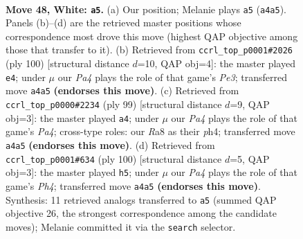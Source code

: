 \documentclass[11pt]{article}
\begin{document}
\clearpage

\begin{figure}[p]\centering
\begin{subfigure}{0.46\textwidth}\centering
\resizebox{\linewidth}{!}{%
\newchessgame
\chessboard[
  setfen={R7/6kr/8/8/P7/6K1/8/8 w - - 3 48},
  showmover=false,
  pgfstyle=straightmove, color=movearrow, markmove={a4-a5}
]}
\caption{}
\end{subfigure}\hfill
\begin{subfigure}{0.46\textwidth}\centering
\resizebox{\linewidth}{!}{%
\newchessgame
\chessboard[
  setfen={8/5R2/rkp5/8/8/4P3/1K6/8 w - - 6 51},
  showmover=false,
  pgfstyle=straightmove, color=movearrow, markmove={e3-e4}
]}
\caption{}
\end{subfigure}
\\[4pt]
\begin{subfigure}{0.46\textwidth}\centering
\resizebox{\linewidth}{!}{%
\newchessgame
\chessboard[
  setfen={8/8/7R/p2k3K/7P/r7/8/8 b - - 0 50},
  showmover=false,
  pgfstyle=straightmove, color=movearrow, markmove={a5-a4}
]}
\caption{}
\end{subfigure}\hfill
\begin{subfigure}{0.46\textwidth}\centering
\resizebox{\linewidth}{!}{%
\newchessgame
\chessboard[
  setfen={8/5k1K/5r2/8/7P/8/8/6R1 w - - 0 51},
  showmover=false,
  pgfstyle=straightmove, color=movearrow, markmove={h4-h5}
]}
\caption{}
\end{subfigure}
\caption{\textbf{Move 48, White: \texttt{a5}.} (a) Our position; Melanie plays \texttt{a5} (\texttt{a4a5}). Panels (b)--(d) are the retrieved master positions whose correspondence most drove this move (highest QAP objective among those that transfer to it). (b) Retrieved from \texttt{ccrl\_top\_p0001\#2026} (ply 100) [structural distance $d$=10, QAP obj=4]: the master played \texttt{e4}; under $\mu$ our \emph{Pa4} plays the role of that game's \emph{Pe3}; transferred move \texttt{a4a5} \textbf{(endorses this move)}. (c) Retrieved from \texttt{ccrl\_top\_p0000\#2234} (ply 99) [structural distance $d$=9, QAP obj=3]: the master played \texttt{a4}; under $\mu$ our \emph{Pa4} plays the role of that game's \emph{Pa4}; cross-type roles: our \emph{R}a8 as their \emph{p}h4; transferred move \texttt{a4a5} \textbf{(endorses this move)}. (d) Retrieved from \texttt{ccrl\_top\_p0001\#634} (ply 100) [structural distance $d$=5, QAP obj=3]: the master played \texttt{h5}; under $\mu$ our \emph{Pa4} plays the role of that game's \emph{Ph4}; transferred move \texttt{a4a5} \textbf{(endorses this move)}. Synthesis: 11 retrieved analogs transferred to \texttt{a5} (summed QAP objective 26, the strongest correspondence among the candidate moves); Melanie committed it via the \texttt{search} selector.}
\label{fig:thought-m94}
\end{figure}
\end{document}
